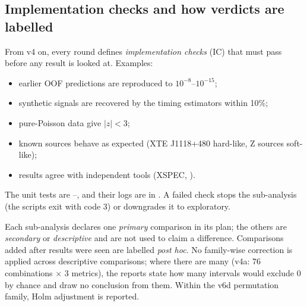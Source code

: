 \subsection{Implementation checks and how verdicts are labelled}\label{sec:ic}
From v4 on, every round defines \emph{implementation checks} (IC) that must pass before any result is looked at. Examples:
\begin{itemize}
\item earlier OOF predictions are reproduced to $10^{-8}$--$10^{-15}$;
\item synthetic signals are recovered by the timing estimators within 10\%;
\item pure-Poisson data give $|z|<3$;
\item known sources behave as expected (XTE J1118+480 hard-like, Z sources soft-like);
\item results agree with independent tools (XSPEC, ).
\end{itemize}
The unit tests are --, and their logs are in . A failed check
stops the sub-analysis (the scripts exit with code 3) or downgrades it to exploratory.

Each sub-analysis declares one \emph{primary} comparison in its plan; the others are \emph{secondary} or \emph{descriptive}
and are not used to claim a difference. Comparisons added after results were seen are labelled \emph{post hoc}. No
family-wise correction is applied across descriptive comparisons; where there are many (v4a: 76 combinations $\times$ 3
metrics), the reports state how many intervals would exclude 0 by chance and draw no conclusion from them. Within the v6d
permutation family, Holm adjustment is reported.
